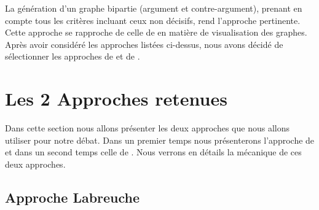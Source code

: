 \documentclass[a4paper, 11pt]{article}
\renewcommand{\textbf}[1]{\begingroup\bfseries\mathversion{bold}#1\endgroup}
\begin{document}
La génération d'un graphe bipartie (argument et contre-argument), prenant en compte tous les critères incluant ceux non décisifs, rend l'approche pertinente. Cette approche se rapproche de celle de \textcolor{blue}{\citep{CARENINI2006925}} en matière de visualisation des graphes.\\


Après avoir considéré les approches listées ci-dessus, nous avons décidé de sélectionner les approches de \textcolor{blue}{\citep{LABREUCHE20111410}} et de \textcolor{blue}{\citep{NUNES2014669}}.





\section{Les 2 Approches retenues}

Dans cette section nous allons présenter les deux approches que nous allons utiliser pour notre débat. Dans un premier temps nous présenterons l'approche de \textcolor{blue}{\citep{LABREUCHE20111410}} et dans un second temps celle de \textcolor{blue}{\citep{NUNES2014669}}. Nous verrons en détails la mécanique de ces deux approches.

\subsection{Approche Labreuche}

\begin{comment}
\noindent \textbf{Modèle} \\

\noindent \textbf{Arguments} \\

\noindent \textbf{Génération des arguments}  \\

\noindent \textbf{Résultats expérimentaux}   \\


\end{comment}
\end{document}
